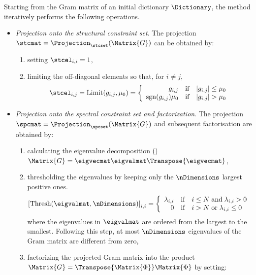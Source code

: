\documentclass{article}
\def \Dic{\Matrix{\Phi}} %
\def \coherence{\mu} 		%
\def \Gram{\Matrix{G}} 						%
\def \gram{g} 								%
\begin{document}
Starting from the Gram matrix of an initial dictionary $\Dictionary$, the  method iteratively performs the following operations.
\begin{itemize}
\item \emph{Projection onto the structural constraint set}. The projection $\stcmat = \Projection_{\stcset}(\Gram)$ can be obtained by:
\begin{enumerate}
\item setting $\stcel_{i,i} = 1$,
\item limiting the off-diagonal elements so that, for $i \neq j$, 
\small
\begin{equation}\label{eq:pscs}
\stcel_{i,j} = \operatorname{Limit}({\gram}_{i,j},\coherence_{0}) = \left\{ \begin{array}{rl}
	\gram_{i,j}  & \text{if} \quad |\gram_{i,j}|\leq \coherence_{0} \\
	\operatorname{sgn}(\gram_{i,j})\coherence_{0}  & \text{if} \quad |\gram_{i,j}| > \coherence_{0}
\end{array} \right.
\end{equation}
\normalsize
\end{enumerate}
\item \emph{Projection onto the spectral constraint set and factorization}. The projection $\spcmat = \Projection_{\spcset}(\Gram)$ and subsequent factorisation are obtained by:
\begin{enumerate}
\item calculating the eigenvalue decomposition () $\Gram = \eigvecmat \eigvalmat \Transpose{\eigvecmat}$,
\item thresholding the eigenvalues by keeping only the $\nDimensions$ largest positive ones.
\begin{equation*}
	\left[\operatorname{Thresh}(\eigvalmat,\nDimensions) \right]_{i,i} = \left\{ \begin{array}{rl}
	\lambda_{i,i}  & \text{if} \quad i \leq N \; \text{and} \; \lambda_{i,i}>0 \\
	0  & \text{if} \quad i > N \; \text{or} \; \lambda_{i,i}\leq 0
	\end{array}\right.
\end{equation*}
where the eigenvalues in $\eigvalmat$ are ordered from the largest to the smallest. Following this step, at most $\nDimensions$ eigenvalues of the Gram matrix are different from zero,
\item factorizing the projected Gram matrix into the product $\Gram=\Transpose{\Dic}\Dic$ by setting:

\end{enumerate}
\end{itemize}
\end{document}
